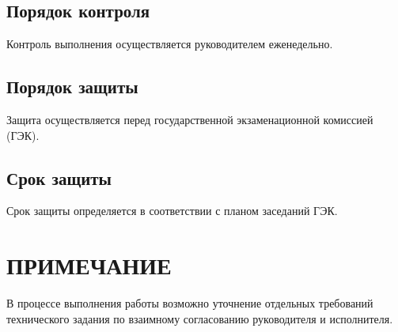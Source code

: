 \documentclass[utf8x, 12pt, oneside, a4paper]{article}
\begin{document}
	\subsection{Порядок контроля}
	Контроль выполнения осуществляется руководителем еженедельно.

	\subsection{Порядок защиты}
	Защита осуществляется перед государственной экзаменационной комиссией (ГЭК).
	
	\subsection{Срок защиты}
	Срок защиты определяется в соответствии с планом заседаний ГЭК.

	\section{ПРИМЕЧАНИЕ}
	В процессе выполнения работы возможно уточнение отдельных требований технического задания по взаимному согласованию руководителя и исполнителя.
\end{document}
